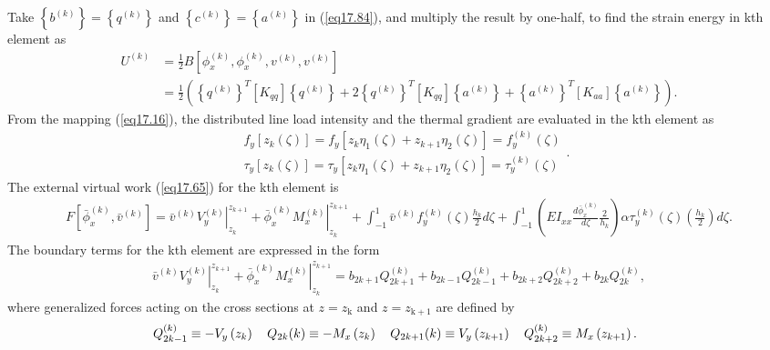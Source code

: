 \documentclass{AeroStructure-ERJohnson}
\begin{document}
Take $\left\{b^{(k)}\right\}=\left\{q^{(k)}\right\}$ and $\left\{c^{(k)}\right\}=\left\{a^{(k)}\right\}$ in (\ref{eq17.84}), and multiply the result by one-half, to find the strain energy in kth element as
\begin{align}\label{eq17.89}
U^{(k)}&=\frac{1}{2} B\left[\phi_{x}^{(k)}, \phi_{x}^{(k)}, v^{(k)}, v^{(k)}\right]\nonumber\\
&=\frac{1}{2}\left(\left\{q^{(k)}\right\}^{T}\left[K_{q q}\right]\left\{q^{(k)}\right\}+2\left\{q^{(k)}\right\}^{T}\left[K_{q q}\right]\left\{a^{(k)}\right\}+\left\{a^{(k)}\right\}^{T}\left[K_{a a}\right]\left\{a^{(k)}\right\}\right).
\end{align}
 From the mapping (\ref{eq17.16}), the distributed line load intensity and the thermal gradient are evaluated in the kth element as
\begin{equation}\label{eq17.90}
\begin{aligned}
&f_{y}\left[z_{k}(\zeta)\right]=f_{y}\left[z_{k} \eta_{1}(\zeta)+z_{k+1} \eta_{2}(\zeta)\right]=f_{y}^{(k)}(\zeta) \\
&\tau_{y}\left[z_{k}(\zeta)\right]=\tau_{y}\left[z_{k} \eta_{1}(\zeta)+z_{k+1} \eta_{2}(\zeta)\right]=\tau_{y}^{(k)}(\zeta)
\end{aligned}.
\end{equation}
The external virtual work (\ref{eq17.65}) for the kth element is
\begin{align}\label{eq17.91}
F\left[\bar{\phi}_{x}^{(k)}, \bar{v}^{(k)}\right]=\left.\bar{v}^{(k)} V_{y}^{(k)}\right|_{z_{k}} ^{z_{k+1}}+\left.\bar{\phi}_{x}^{(k)} M_{x}^{(k)}\right|_{z_{k}} ^{z_{k+1}}+\int_{-1}^{1} \bar{v}^{(k)} f_{y}^{(k)}(\zeta) \frac{h_{k}}{2} d \zeta+\int_{-1}^{1}\left(E I_{x x} \frac{d \bar{\phi}_{x}^{(k)}}{d \zeta} \frac{2}{h_{k}}\right) \alpha \tau_{y}^{(k)}(\zeta)\left(\frac{h_{k}}{2}\right) d \zeta.
\end{align}
The boundary terms for the kth element are expressed in the form
\begin{align}\label{eq17.92}
\left.\bar{v}^{(k)} V_{y}^{(k)}\right|_{z_{k}} ^{z_{k+1}}+\left.\bar{\phi}_{x}^{(k)} M_{x}^{(k)}\right|_{z_{k}} ^{z_{k+1}}=b_{2 k+1} Q_{2 k+1}^{(k)}+b_{2 k-1} Q_{2 k-1}^{(k)}+b_{2 k+2} Q_{2 k+2}^{(k)}+b_{2 k} Q_{2 k}^{(k)},
\end{align}
where generalized forces acting on the cross sections at $z= z_{\textrm{k}}$ and $z=z_{\textrm{k}+1}$ are defined by
\begin{align}\label{eq17.93}
Q_{2k-1}^{(k)} \equiv-V_{y}\left(z_{k}\right) \quad Q_{2k}(k) \equiv-M_{x}\left(z_{k}\right) \quad Q_{2 k+1}(k) \equiv V_{y}\left(z_{k+1}\right) \quad Q_{2 k+2}^{(k)} \equiv M_{x}\left(z_{k+1}\right). \hspace*{6pt}
\end{align}
\end{document}
